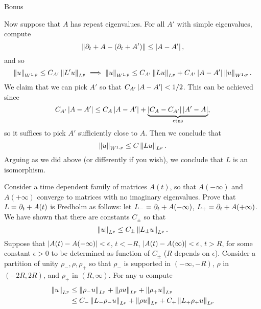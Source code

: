 \documentclass{amsart}
\begin{document}
\begin{clear}{Bonus}
\begin{xca}
  Now suppose that $A$ has repeat eigenvalues. For all $A'$ with
  simple eigenvalues, compute
  \begin{equation*}
    \left\lVert\partial_{t}+A-(\partial_{t}+A')\right\rVert\le \left|A-A'\right|,
  \end{equation*}
  and so 
  \begin{equation*}
    \left\lVert u\right\rVert_{W^{1,p}}\le C_{A'}\left\lVert L'u\right\rVert_{L^{p}}\implies
    \left\lVert u\right\rVert_{W^{1,p}}\le
    C_{A'}\left\lVert Lu\right\rVert_{L^{p}}+C_{A'}\left|A-A'\right|\left\lVert u\right\rVert_{W^{1,p}}. 
  \end{equation*}
  We claim that we can pick $A'$ so that $C_{A'}\left|A-A'\right|<1/2$. This
  can be achieved since
  \begin{equation*}
    C_{A'}\left|A-A'\right|\le C_{A}\left|A-A'\right|+\underbrace{\left|C_{A}-C_{A'}\right|\left|A'-A\right|}_{\text{ctns}},
  \end{equation*}
  so it suffices to pick $A'$ sufficiently close to $A$. Then we
  conclude that
  \begin{equation*}
    \left\lVert u\right\rVert_{W^{1,p}}\le
    C\left\lVert Lu\right\rVert_{L^{p}}.
  \end{equation*}
  Arguing as we did above (or differently if you wish), we conclude that $L$ is an isomorphism.  
\end{xca}
\begin{xca}
  Consider a time dependent family of matrices $A(t)$, so that
  $A(-\infty)$ and $A(+\infty)$ converge to matrices with no
  imaginary eigenvalues. Prove that $L=\partial_{t}+A(t)$ is Fredholm as
  follows: let $L_{-}=\partial_{t}+A(-\infty)$,
  $L_{+}=\partial_{t}+A(+\infty)$. We have shown that there are constants
  $C_{\pm}$ so that
  \begin{equation*}
    \left\lVert u\right\rVert_{L^{p}}\le C_{\pm}\left\lVert L_{\pm}u\right\rVert_{L^{p}}.
  \end{equation*}
  Suppose that $\left|A(t)-A(-\infty)\right|<\epsilon$, $t<-R$,
  $\left|A(t)-A(\infty)\right|<\epsilon$, $t>R$, for some constant $\epsilon>0$
  to be determined as function of $C_{\pm }$ ($R$ depends on $\epsilon$). Consider a partition
  of unity $\rho_{-},\rho,\rho_{+}$ so that $\rho_{-}$ is supported in
  $(-\infty,-R)$, $\rho$ in $(-2R,2R)$, and $\rho_{+}$ in
  $(R,\infty)$. For any $u$ compute
  \begin{equation*}
    \begin{aligned}
      \norm{u}_{L^{p}}&\le \norm{\rho_{-}u}_{L^{p}}+\norm{\rho
        u}_{L^{p}}+\norm{\rho_{+}u}_{L^{p}}\\
      &\le C_{-}\norm{L_{-}\rho_{-}u}_{L^{p}}+\norm{\rho
        u}_{L^{p}}+C_{+}\norm{L_{+}\rho_{+}u}_{L^{p}}\\

\end{aligned}
\end{equation*}
\end{xca}
\end{clear}
\end{document}

